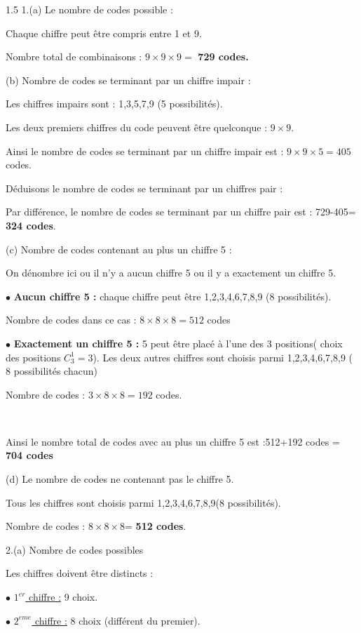 \documentclass[12pt]{article}
\begin{document}
\begin{spacing}{1.5}
1.(a) Le nombre de codes possible :

Chaque chiffre peut être compris entre 1 et 9.

Nombre total de combinaisons : $9\times 9\times 9 =$\textbf{ 729 codes.}

(b) Nombre de codes se terminant par un chiffre impair :

Les chiffres impairs sont : 1,3,5,7,9 (5 possibilités).

Les deux premiers chiffres du code peuvent être quelconque : $9\times 9$.

Ainsi le nombre de codes se terminant par un chiffre impair est : $9\times 9\times 5=405$ codes.

\medskip
Déduisons le nombre de codes se terminant par un chiffres pair :

Par différence, le nombre de codes se terminant par un chiffre pair est :  729-405=\textbf{ 324 codes}.

(c) Nombre de codes contenant au plus un chiffre 5 :

On dénombre ici ou il n'y a aucun chiffre 5 ou il y a exactement un chiffre 5.

$\bullet$ \textbf{Aucun chiffre 5 :} chaque chiffre peut être 1,2,3,4,6,7,8,9 (8 possibilités).

Nombre de codes dans ce cas : $8\times 8\times 8=512$  codes

$\bullet$ \textbf{Exactement un chiffre 5 :} 5 peut être placé à l'une des 3 positions( choix des positions $C_3^1=3$). Les deux autres chiffres sont choisis parmi 1,2,3,4,6,7,8,9 ( 8 possibilités chacun)

Nombre de codes : $3\times 8\times 8 = 192$ codes.

$\quad$

Ainsi le nombre total de codes avec au plus un chiffre 5 est :512+192 codes = \textbf{704 codes}


(d) Le nombre de codes ne contenant pas le chiffre 5.

Tous les chiffres sont choisis parmi 1,2,3,4,6,7,8,9(8 possibilités).

Nombre de codes : $8\times 8\times 8$= \textbf{512 codes}.

\quad

2.(a) Nombre de codes possibles

Les chiffres doivent être distincts :

$\bullet$ \underline{$1^{er}$ chiffre :} 9 choix.

$\bullet$ \underline{$2^{eme}$ chiffre :} 8 choix (différent du premier).


\end{spacing}
\end{document}

